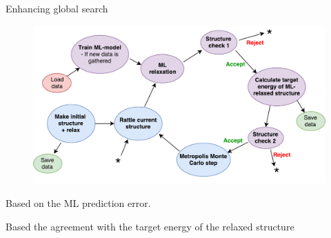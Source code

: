 \documentclass{beamer}
\begin{document}
\begin{frame}{Enhancing global search}
\begin{figure}
	\centering
	\includegraphics[width=0.9\linewidth]{MLenhancedGlobalSearch2}
	\label{fig:mlenhancedglobalsearch2}
\end{figure}
\begin{description}[style=multiline, leftmargin=!]
	\item[\textbf{Structure check 1:}] Based on the ML prediction error.
	\item[\textbf{Structure check 2:}] Based the agreement with the target energy of the relaxed structure
\end{description}
\end{frame}
\end{document}
